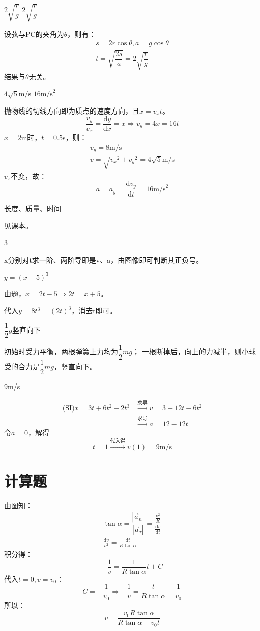 \documentclass[b5paper,opensource]{./template/qyxf-book}
\newcommand{\di}[1]{\mathrm{d}#1}
\newcommand{\dy}[2]{\frac{\di{#1}}{\di{#2}}}
\begin{document}
$2\sqrt{\dfrac{r}{g}}$ \qquad $2\sqrt{\dfrac{r}{g}}$

\solve
设弦与PC的夹角为$\theta$，则有：
\begin{gather*}
	s=2r\cos\theta,a=g\cos\theta\\
	t=\sqrt{\dfrac{2s}{a}}=2\sqrt{\dfrac{r}{g}}
\end{gather*}
结果与$\theta$无关。


$4\sqrt{5}\textrm{m/s}$ \qquad $16\textrm{m/s}^2$

\solve
抛物线的切线方向即为质点的速度方向，且$x=v_xt$。
\[
	\dfrac{v_y}{v_x}=\dy{y}{x}=x\Rightarrow v_y=4x=16t
\]
$x=2$m时，$t=0.5$s，则：
\begin{gather*}
	v_y=8\textrm{m/s}\\
	v=\sqrt{{v_x}^2+{v_y}^2}=4\sqrt{5}\mathrm{m/s}
\end{gather*}
$v_x$不变，故：
\[
	a=a_y=\dy{v_y}{t}=16\textrm{m/s}^2
\]

长度、质量、时间

\solve
见课本。

3

\solve
x分别对t求一阶、两阶导即是v、a，由图像即可判断其正负号。

$y={(x+5)}^3$

\solve 
由题，$x=2t-5\Rightarrow 2t=x+5$。

代入$y=8t^3={(2t)}^3$，消去t即可。

$\dfrac{1}{2}g$\qquad 竖直向下

\solve
初始时受力平衡，两根弹簧上力均为$\dfrac{1}{2}mg$；
一根断掉后，向上的力减半，则小球受的合力是$\dfrac{1}{2}mg$，竖直向下。

$9$m/s

\solve
\begin{align*}
	\text{(SI)} x=3t+6t^2-2t^3&\xrightarrow{\text{求导}}v=3+12t-6t^2\\
	&\xrightarrow{\text{求导}}a=12-12t
\end{align*}
令$a=0$，解得
\[
	t=1\xrightarrow{\text{代入得}} v(1)=9\mathrm{m/s}
\]

\section{计算题}


\solve
由图知：
\begin{gather*}
	\tan\alpha=\dfrac{|\vec{a}_n|}{|\vec{a}_\tau|}=\dfrac{\frac{v^2}{R}}{\dy{v}{t}}\\
	\frac{\di{v}}{v^2}=\frac{\di{t}}{R\tan\alpha}
\end{gather*}
积分得：
\[
	-\frac{1}{v}=\frac{1}{R\tan\alpha}t+C
\]
代入$t=0,v=v_0$：
\[
	C=-\dfrac{1}{v_0}\Rightarrow -\frac{1}{v}=\frac{t}{R\tan\alpha}-\dfrac{1}{v_0}
\]
所以：
\[
	v=\frac{v_0R\tan\alpha}{R\tan\alpha-v_0t}
\]
\end{document}
